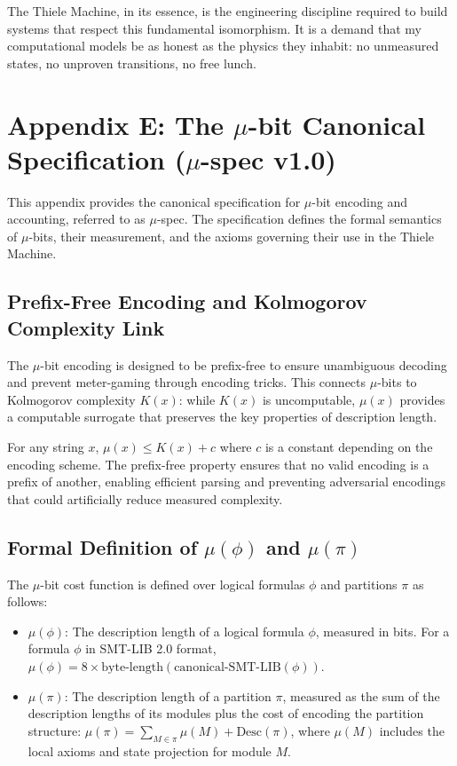 \documentclass[11pt]{article}
\begin{document}
The Thiele Machine, in its essence, is the engineering discipline required to build systems that respect this fundamental isomorphism. It is a demand that my computational models be as honest as the physics they inhabit: no unmeasured states, no unproven transitions, no free lunch.
\section{Appendix E: The $\mu$-bit Canonical Specification ($\mu$-spec v1.0)}\label{appendix:mu-spec}

This appendix provides the canonical specification for $\mu$-bit encoding and accounting, referred to as $\mu$-spec. The specification defines the formal semantics of $\mu$-bits, their measurement, and the axioms governing their use in the Thiele Machine.

\subsection{Prefix-Free Encoding and Kolmogorov Complexity Link}

The $\mu$-bit encoding is designed to be prefix-free to ensure unambiguous decoding and prevent meter-gaming through encoding tricks. This connects $\mu$-bits to Kolmogorov complexity $K(x)$: while $K(x)$ is uncomputable, $\mu(x)$ provides a computable surrogate that preserves the key properties of description length.

For any string $x$, $\mu(x) \leq K(x) + c$ where $c$ is a constant depending on the encoding scheme. The prefix-free property ensures that no valid encoding is a prefix of another, enabling efficient parsing and preventing adversarial encodings that could artificially reduce measured complexity.

\subsection{Formal Definition of $\mu(\phi)$ and $\mu(\pi)$}

The $\mu$-bit cost function is defined over logical formulas $\phi$ and partitions $\pi$ as follows:

\begin{itemize}
  \item $\mu(\phi)$: The description length of a logical formula $\phi$, measured in bits. For a formula $\phi$ in SMT-LIB 2.0 format, $\mu(\phi) = 8 \times \text{byte-length}(\text{canonical-SMT-LIB}(\phi))$.
  \item $\mu(\pi)$: The description length of a partition $\pi$, measured as the sum of the description lengths of its modules plus the cost of encoding the partition structure: $\mu(\pi) = \sum_{M \in \pi} \mu(M) + \text{Desc}(\pi)$, where $\mu(M)$ includes the local axioms and state projection for module $M$.
\end{itemize}
\end{document}
